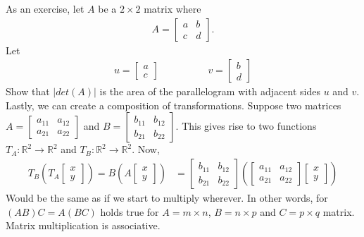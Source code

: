 \documentclass[a4paper]{article}
\theoremstyle{plain}
\theoremstyle{definition}
\theoremstyle{remark}
\begin{document}
As an exercise, let $A$ be a $2\times 2$ matrix where
\begin{align*}
	A = \begin{bmatrix} a & b \\ c & d \end{bmatrix} .
\end{align*}
Let 
\begin{align*}
	u = \begin{bmatrix} a \\ c \end{bmatrix} \;\;\;\;\;\;\;\;\;\;\;\;\;\;\;& v = \begin{bmatrix} b \\ d \end{bmatrix} 
\end{align*}
Show that $|det(A)|$ is the area of the parallelogram with adjacent sides $u$ and $v$. \\
Lastly, we can create a composition of transformations. Suppose two matrices $A = \begin{bmatrix} a_{11} & a_{12} \\ a_{21} & a_{22} \end{bmatrix} $ and $B = \begin{bmatrix} b_{11} & b_{12} \\ b_{21} & b_{22} \end{bmatrix} $. This gives rise to two functions $T_A : \mathbb{R}^2 \to  \mathbb{R}^2$ and $T_B : \mathbb{R}^2 \to  \mathbb{R}^2$. Now,
\begin{align*}
	T_B\left( T_A \begin{bmatrix} x \\ y \end{bmatrix}  \right)  = B \left( A \begin{bmatrix} x \\y \end{bmatrix} \right) &= \begin{bmatrix} b_{11} & b_{12} \\ b_{21} & b_{22} \end{bmatrix} \left( \begin{bmatrix} a_{11} & a_{12} \\ a_{21} & a_{22} \end{bmatrix} \begin{bmatrix} x \\y \end{bmatrix}  \right)
\end{align*}
Would be the same as if we start to multiply wherever. In other words, for $(AB)C = A(BC)$ holds true for $A = m\times n$, $B = n \times p$ and $C = p \times q$ matrix. Matrix multiplication is associative.
\end{document}
